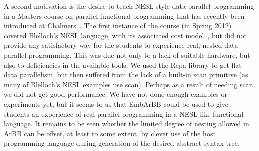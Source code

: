 A second motivation is the desire to teach NESL-style data parallel programming
in a Masters course on parallel functional programming that has recently been
introduced at Chalmers~\cite{TFPIEPFP}. The first instance of the course (in Spring 2012)
covered Blelloch's NESL language, with its
associated cost model~\cite{NESL}, but did not provide any satisfactory way for the students
to experience real, nested data parallel programming. This was due not only to a lack of suitable hardware, but also to deficiencies in the available tools.
We used the Repa library to get flat data parallelism, but then suffered from
the lack of a built-in scan primitive (as many of Blelloch's NESL examples use scan). Perhaps as a result
of needing scan, we did not get good performance.
We have not done enough examples or experiments yet, but it seems to us that EmbArBB
could be used to give students an experience of real parallel programming in a NESL-like
functional language. It remains to be seen whether the limited degree of nesting allowed in ArBB can be offset, at least to some extent, by clever use of the host programming language during generation of the desired abstract syntax tree.


